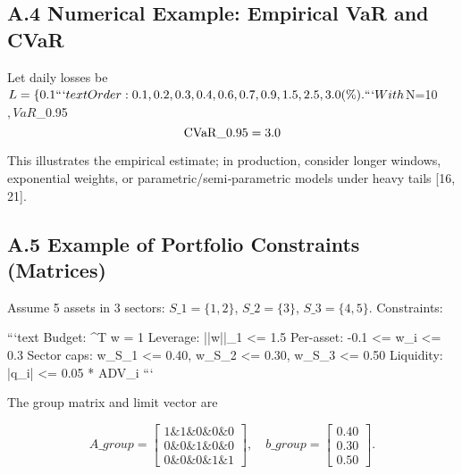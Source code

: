\documentclass[11pt,a4paper]{article}
\begin{document}
\subsection{A.4 Numerical Example: Empirical VaR and CVaR}

Let daily losses be $L=\{0.1\\%

```text
Order: 0.1, 0.2, 0.3, 0.4, 0.6, 0.7, 0.9, 1.5, 2.5, 3.0 (\%).
```

With $N=10$, VaR$\_{0.95}\\%

\begin{equation}
\mathrm{CVaR}\_{0.95} = 3.0\\%
\end{equation}

This illustrates the empirical estimate; in production, consider longer windows, exponential weights, or parametric/semi‑parametric models under heavy tails [16, 21].

\subsection{A.5 Example of Portfolio Constraints (Matrices)}

Assume 5 assets in 3 sectors: $S\_1=\{1,2\}$, $S\_2=\{3\}$, $S\_3=\{4,5\}$. Constraints:

```text
Budget:        ^T w = 1
Leverage:      ||w||\_1 <= 1.5
Per-asset:     -0.1 <= w\_i <= 0.3
Sector caps:   w\_{S\_1} <= 0.40, w\_{S\_2} <= 0.30, w\_{S\_3} <= 0.50
Liquidity:     |q\_i| <= 0.05 * ADV\_i
```

The group matrix and limit vector are

\begin{equation}
A\_{group} = \begin{bmatrix}
1 \& 1 \& 0 \& 0 \& 0\\
0 \& 0 \& 1 \& 0 \& 0\\
0 \& 0 \& 0 \& 1 \& 1
\end{bmatrix},\quad b\_{group} = \begin{bmatrix}0.40\\0.30\\0.50\end{bmatrix}.
\end{equation}
\end{document}

